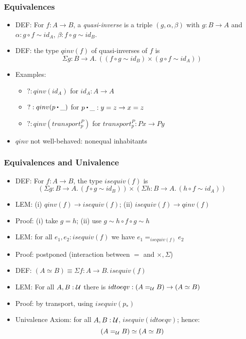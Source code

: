 \documentclass[handout]{beamer}
\newcommand{\sigm}[3]{\Sigma{#1{:}#2.\,#3}}
\newcommand{\UU}{{\cal U}}
\newcommand{\ct}{%
  \mathchoice{\mathbin{\raisebox{0.5ex}{$\displaystyle\centerdot$}}}%
             {\mathbin{\raisebox{0.5ex}{$\centerdot$}}}%
             {\mathbin{\raisebox{0.25ex}{$\scriptstyle\,\centerdot\,$}}}%
             {\mathbin{\raisebox{0.1ex}{$\scriptscriptstyle\,\centerdot\,$}}}
}
\begin{document}
\frame
  {

    \frametitle{Equivalences}

    \begin{itemize}[<+->]
    \item DEF: For $f:A\to B$, a \emph{quasi-inverse} is a triple $(g,\alpha,\beta)$ 
    with $g:B\to A$ and $\alpha:g\circ f \sim id_A$, $\beta:f\circ g \sim id_B$.
    \item DEF: the type $qinv(f)$ of quasi-inverses of $f$ is 
          $$\sigm{g}{B\to A}{((f\circ g \sim id_B) \times (g\circ f \sim id_A))}$$
   \item Examples:
      \begin{itemize}[<+->]
      \item $?:qinv(id_A)$ for $id_A: A\to A$
      \item $?:qinv(p\ct\_)$ for $p\ct\_ : y=z \to x=z$
      \item $?:qinv(transport^P_p)$ for $transport^P_p : Px \to Py$
      \end{itemize}
    \item $qinv$ not well-behaved: nonequal inhabitants
    \end{itemize}
  }

\frame
  {

    \frametitle{Equivalences and Univalence}

    \begin{itemize}[<+->]
    \item DEF: For $f:A\to B$, the type $isequiv(f)$ is 
          $$(\sigm{g}{B\to A}{(f\circ g \sim id_B)}) \times (\sigm{h}{B\to A}{(h\circ f \sim id_A)})$$
    \item LEM: (i) $qinv(f)\to isequiv(f)$; (ii) $isequiv(f)\to qinv(f)$
    \item Proof: (i) take $g=h$; (ii) use $g\sim h\circ f\circ g \sim h$
    \item LEM: for all $e_1,e_2:isequiv(f)$ we have $e_1 =_{isequiv(f)} e_2$
    \item Proof: postponed (interaction between $=$ and $\times,\Sigma$)
    \item DEF: $(A\simeq B) \equiv \sigm{f}{A\to B}{isequiv(f)}$
    \item LEM: For all $A,B:\UU$ there is $idtoeqv: (A=_\UU B) \to (A\simeq B)$
    \item Proof: by transport, using $isequiv(p_*)$
    \item Univalence Axiom: for all $A,B:\UU$, $isequiv(idtoeqv)$; hence:
          $$(A=_\UU B) \simeq (A\simeq B)$$
    \end{itemize}
  }
\end{document}
